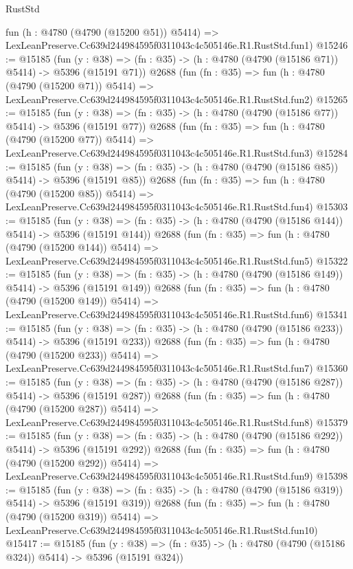 \begin{lexlean}{RustStd}
\begin{coremodule}
    fun (h : @4780 (@4790 (@15200 @51)) @5414) =>
    LexLeanPreserve.Cc639d244984595f0311043c4c505146e.R1.RustStd.fun1)
@15246 := @15185
    (fun (y : @38) => (fn : @35) -> (h : @4780 (@4790 (@15186 @71)) @5414) -> @5396 (@15191 @71))
    @2688
    (fun (fn : @35) =>
    fun (h : @4780 (@4790 (@15200 @71)) @5414) =>
    LexLeanPreserve.Cc639d244984595f0311043c4c505146e.R1.RustStd.fun2)
@15265 := @15185
    (fun (y : @38) => (fn : @35) -> (h : @4780 (@4790 (@15186 @77)) @5414) -> @5396 (@15191 @77))
    @2688
    (fun (fn : @35) =>
    fun (h : @4780 (@4790 (@15200 @77)) @5414) =>
    LexLeanPreserve.Cc639d244984595f0311043c4c505146e.R1.RustStd.fun3)
@15284 := @15185
    (fun (y : @38) => (fn : @35) -> (h : @4780 (@4790 (@15186 @85)) @5414) -> @5396 (@15191 @85))
    @2688
    (fun (fn : @35) =>
    fun (h : @4780 (@4790 (@15200 @85)) @5414) =>
    LexLeanPreserve.Cc639d244984595f0311043c4c505146e.R1.RustStd.fun4)
@15303 := @15185
    (fun (y : @38) => (fn : @35) -> (h : @4780 (@4790 (@15186 @144)) @5414) -> @5396 (@15191 @144))
    @2688
    (fun (fn : @35) =>
    fun (h : @4780 (@4790 (@15200 @144)) @5414) =>
    LexLeanPreserve.Cc639d244984595f0311043c4c505146e.R1.RustStd.fun5)
@15322 := @15185
    (fun (y : @38) => (fn : @35) -> (h : @4780 (@4790 (@15186 @149)) @5414) -> @5396 (@15191 @149))
    @2688
    (fun (fn : @35) =>
    fun (h : @4780 (@4790 (@15200 @149)) @5414) =>
    LexLeanPreserve.Cc639d244984595f0311043c4c505146e.R1.RustStd.fun6)
@15341 := @15185
    (fun (y : @38) => (fn : @35) -> (h : @4780 (@4790 (@15186 @233)) @5414) -> @5396 (@15191 @233))
    @2688
    (fun (fn : @35) =>
    fun (h : @4780 (@4790 (@15200 @233)) @5414) =>
    LexLeanPreserve.Cc639d244984595f0311043c4c505146e.R1.RustStd.fun7)
@15360 := @15185
    (fun (y : @38) => (fn : @35) -> (h : @4780 (@4790 (@15186 @287)) @5414) -> @5396 (@15191 @287))
    @2688
    (fun (fn : @35) =>
    fun (h : @4780 (@4790 (@15200 @287)) @5414) =>
    LexLeanPreserve.Cc639d244984595f0311043c4c505146e.R1.RustStd.fun8)
@15379 := @15185
    (fun (y : @38) => (fn : @35) -> (h : @4780 (@4790 (@15186 @292)) @5414) -> @5396 (@15191 @292))
    @2688
    (fun (fn : @35) =>
    fun (h : @4780 (@4790 (@15200 @292)) @5414) =>
    LexLeanPreserve.Cc639d244984595f0311043c4c505146e.R1.RustStd.fun9)
@15398 := @15185
    (fun (y : @38) => (fn : @35) -> (h : @4780 (@4790 (@15186 @319)) @5414) -> @5396 (@15191 @319))
    @2688
    (fun (fn : @35) =>
    fun (h : @4780 (@4790 (@15200 @319)) @5414) =>
    LexLeanPreserve.Cc639d244984595f0311043c4c505146e.R1.RustStd.fun10)
@15417 := @15185
    (fun (y : @38) => (fn : @35) -> (h : @4780 (@4790 (@15186 @324)) @5414) -> @5396 (@15191 @324))

\end{coremodule}
\end{lexlean}
